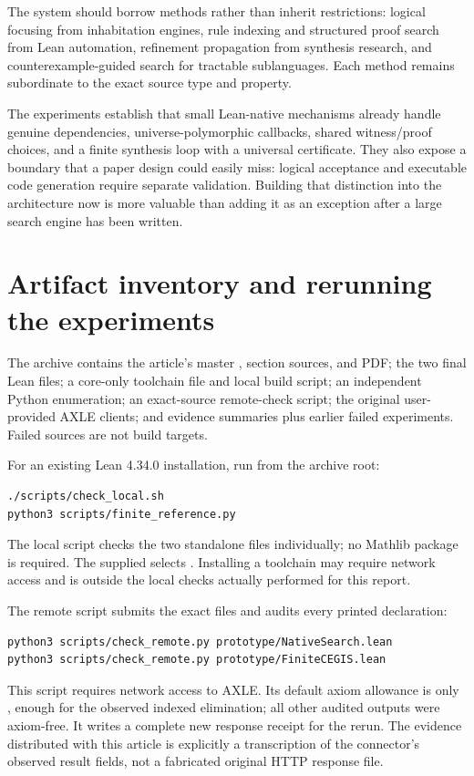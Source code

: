 The system should borrow methods rather than inherit restrictions: logical focusing from inhabitation engines, rule indexing and structured proof search from Lean automation, refinement propagation from synthesis research, and counterexample-guided search for tractable sublanguages. Each method remains subordinate to the exact source type and property.

The experiments establish that small Lean-native mechanisms already handle genuine dependencies, universe-polymorphic callbacks, shared witness/proof choices, and a finite synthesis loop with a universal certificate. They also expose a boundary that a paper design could easily miss: logical acceptance and executable code generation require separate validation. Building that distinction into the architecture now is more valuable than adding it as an exception after a large search engine has been written.

\appendix
\section{Artifact inventory and rerunning the experiments}

The archive contains the article's master , section sources, and PDF; the two final Lean files; a core-only toolchain file and local build script; an independent Python enumeration; an exact-source remote-check script; the original user-provided AXLE clients; and evidence summaries plus earlier failed experiments. Failed sources are not build targets.

For an existing Lean 4.34.0 installation, run from the archive root:
\begin{lstlisting}[language={}]
./scripts/check_local.sh
python3 scripts/finite_reference.py
\end{lstlisting}
The local script checks the two standalone files individually; no Mathlib package is required. The supplied  selects . Installing a toolchain may require network access and is outside the local checks actually performed for this report.

The remote script submits the exact files and audits every printed declaration:
\begin{lstlisting}[language={}]
python3 scripts/check_remote.py prototype/NativeSearch.lean
python3 scripts/check_remote.py prototype/FiniteCEGIS.lean
\end{lstlisting}
This script requires network access to AXLE. Its default axiom allowance is only , enough for the observed indexed elimination; all other audited outputs were axiom-free. It writes a complete new response receipt for the rerun. The evidence distributed with this article is explicitly a transcription of the connector's observed result fields, not a fabricated original HTTP response file.

